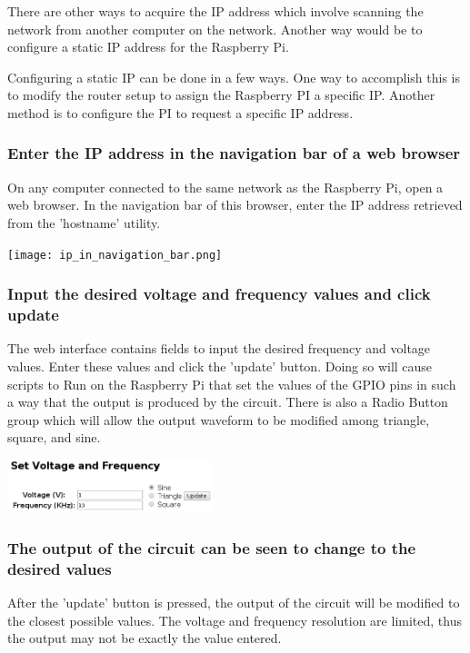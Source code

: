 \documentclass{article}	%
\begin{document}
\begin{multicols}{2}
There are other ways to acquire the IP address
which involve scanning the network from
another computer on the network.
Another way would be to configure a static IP address
for the Raspberry Pi.

Configuring a static IP can be done in a few ways.
One way to accomplish this is
to modify the router setup to assign the Raspberry PI a specific IP.
Another method is to configure the PI to request a specific IP address.

\subsubsection{Enter the IP address in the navigation bar of a web browser}
On any computer connected to the same network as the Raspberry Pi,
open a web browser.
In the navigation bar of this browser,
enter the IP address retrieved from the 'hostname' utility.

\begin{center}
\texttt{[image: ip\_in\_navigation\_bar.png]}
\end{center}

\subsubsection{Input the desired voltage and frequency values and click update}
The web interface contains fields to input the desired frequency and voltage values.
Enter these values and click the 'update' button.
Doing so will cause scripts to Run on the Raspberry Pi that
set the values of the GPIO pins in such a way that the output is produced
by the circuit.
There is also a Radio Button group which will allow the 
output waveform to be modified among triangle, square, and sine.

\begin{center}
\includegraphics[width=0.45\textwidth,keepaspectratio]{web_interface_updating_values.png}
\end{center}

\subsubsection{The output of the circuit can be seen to change to the desired values}
After the 'update' button is pressed,
the output of the circuit will be modified
to the closest possible values.
The voltage and frequency resolution are limited,
thus the output may not be exactly the value entered.


\end{multicols}
\end{document}
